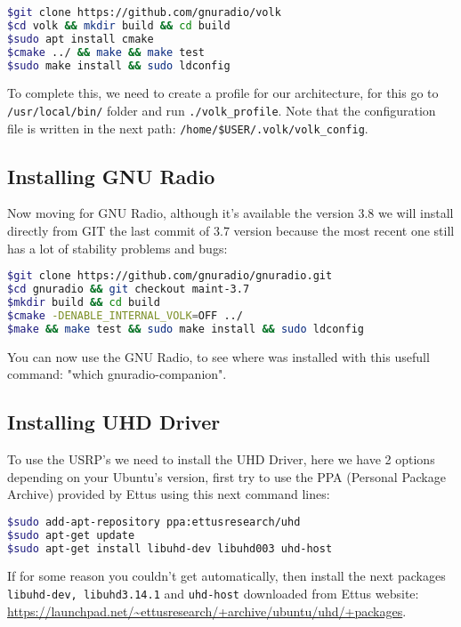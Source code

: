 \documentclass[a4paper, 10pt, conference]{ieeeconf}      %
\begin{document}
\begin{lstlisting}[language=bash, breaklines]
$git clone https://github.com/gnuradio/volk
$cd volk && mkdir build && cd build
$sudo apt install cmake
$cmake ../ && make && make test
$sudo make install && sudo ldconfig
\end{lstlisting}

To complete this, we need to create a profile for our architecture, for this go to \verb|/usr/local/bin/| folder and run \verb|./volk_profile|. Note that the configuration file is written in the next path: \verb|/home/$USER/.volk/volk_config|.

\subsection{Installing GNU Radio}
Now moving for GNU Radio, although it's available the version 3.8 we will install directly from GIT the last commit of 3.7 version because the most recent one still has a lot of stability problems and bugs:

\begin{lstlisting}[language=bash, breaklines]
$git clone https://github.com/gnuradio/gnuradio.git
$cd gnuradio && git checkout maint-3.7
$mkdir build && cd build
$cmake -DENABLE_INTERNAL_VOLK=OFF ../
$make && make test && sudo make install && sudo ldconfig
\end{lstlisting}

You can now use the GNU Radio, to see where was installed with this usefull command: "which gnuradio-companion".

\subsection{Installing UHD Driver}
To use the USRP's we need to install the UHD Driver, here we have 2 options depending on your Ubuntu's version, first try to use the PPA (Personal Package Archive) provided by Ettus using this next command lines:

\begin{lstlisting}[language=bash, breaklines]
$sudo add-apt-repository ppa:ettusresearch/uhd
$sudo apt-get update
$sudo apt-get install libuhd-dev libuhd003 uhd-host
\end{lstlisting}

If for some reason you couldn't get automatically, then install the next packages \verb|libuhd-dev, libuhd3.14.1| and \verb|uhd-host| downloaded from Ettus website: \url{https://launchpad.net/~ettusresearch/+archive/ubuntu/uhd/+packages}.
\end{document}
